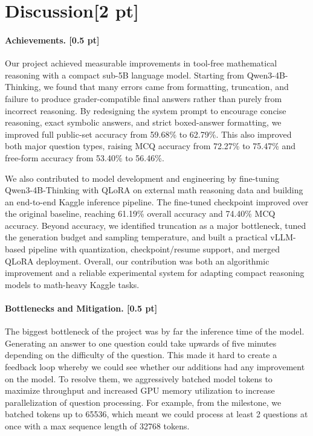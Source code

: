 \documentclass{article}
\begin{document}
\section{Discussion[2 pt]}
\label{sec:discussion}

\paragraph{Achievements. [0.5 pt]}

Our project achieved measurable improvements in tool-free mathematical reasoning with a compact sub-5B language model. Starting from Qwen3-4B-Thinking, we found that many errors came from formatting, truncation, and failure to produce grader-compatible final answers rather than purely from incorrect reasoning. By redesigning the system prompt to encourage concise reasoning, exact symbolic answers, and strict boxed-answer formatting, we improved full public-set accuracy from 59.68\% to 62.79\%. This also improved both major question types, raising MCQ accuracy from 72.27\% to 75.47\% and free-form accuracy from 53.40\% to 56.46\%.

We also contributed to model development and engineering by fine-tuning Qwen3-4B-Thinking with QLoRA on external math reasoning data and building an end-to-end Kaggle inference pipeline. The fine-tuned checkpoint improved over the original baseline, reaching 61.19\% overall accuracy and 74.40\% MCQ accuracy. Beyond accuracy, we identified truncation as a major bottleneck, tuned the generation budget and sampling temperature, and built a practical vLLM-based pipeline with quantization, checkpoint/resume support, and merged QLoRA deployment. Overall, our contribution was both an algorithmic improvement and a reliable experimental system for adapting compact reasoning models to math-heavy Kaggle tasks.

\paragraph{Bottlenecks and Mitigation. [0.5 pt]}

The biggest bottleneck of the project was by far the inference time of the model. Generating an answer to one question could take upwards of five minutes depending on the difficulty of the question. This made it hard to create a feedback loop whereby we could see whether our additions had any improvement on the model. To resolve them, we aggressively batched model tokens to maximize throughput and increased GPU memory utilization to increase parallelization of question processing. For example, from the milestone, we batched tokens up to 65536, which meant we could process at least 2 questions at once with a max sequence length of 32768 tokens. 
\end{document}
